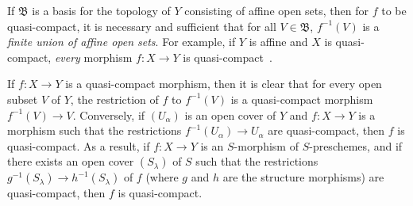 If $\mathfrak{B}$ is a basis for the topology of $Y$ consisting of affine open sets, then for $f$ to be quasi-compact, it is necessary and sufficient that for all $V\in\mathfrak{B}$, $f^{-1}(V)$ is a \emph{finite union of affine open sets}.
For example, if $Y$ is affine and $X$ is quasi-compact, \emph{every} morphism $f:X\to Y$ is quasi-compact~.

If $f:X\to Y$ is a quasi-compact morphism, then it is clear that for every open subset $V$ of $Y$, the restriction of $f$ to $f^{-1}(V)$ is a quasi-compact morphism $f^{-1}(V)\to V$.
Conversely, if $(U_\alpha)$ is an open cover of $Y$ and $f:X\to Y$ is a morphism such that the restrictions $f^{-1}(U_\alpha)\to U_\alpha$ are quasi-compact, then $f$ is quasi-compact.
As
a result, if $f:X\to Y$ is an $S$-morphism of $S$-preschemes, and if there exists an open cover $(S_\lambda)$ of $S$ such that the restrictions $g^{-1}(S_\lambda)\to h^{-1}(S_\lambda)$ of $f$ (where $g$ and $h$ are the structure morphisms) are quasi-compact, then $f$ is quasi-compact.



